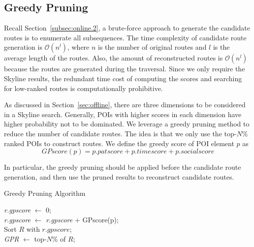 \vspace{-2mm}

\subsection{Greedy Pruning}
Recall Section~\ref{subsec:online.2}, a brute-force approach to generate the candidate routes is to enumerate all subsequences. The time complexity of candidate route generation is $\mathcal{O}(n^l)$, where $n$ is the number of original routes and $l$ is the average length of the routes. Also, the amount of reconstructed routes is $\mathcal{O}(n^l)$ because the routes are generated during the traversal. Since we only require the Skyline results, the redundant time cost of computing the scores and searching for low-ranked routes is computationally prohibitive. %

As discussed in Section~\ref{sec:offline}, there are three dimensions to be considered in a Skyline search. Generally, POIs with higher scores in each dimension have higher probability not to be dominated. We leverage a greedy pruning method to reduce the number of candidate routes. The idea is that we only use the top-$N$\% ranked POIs to construct routes. We define the greedy score of POI element $p$ as 
\begin{equation}
GPscore(p) = p.patscore+p.timescore+p.socialscore
\end{equation}

In particular, the greedy pruning should be applied before the candidate route generation, and then use the pruned results to reconstruct candidate routes. %

\begin{algorithm}[h] 
  \caption{Greedy Pruning Algorithm}
  \label{algo:GP}
  \small
  \Indm
  \Indp
   {
    \textit{r.gpscore} $\leftarrow$ 0;\\
     {   
      \textit{r.gpscore} $\leftarrow$ \textit{r.gpscore} + GPscore(p);\\
    }
  }
  Sort $R$ with $r.gpscore$;\\
  \textit{GPR} $\leftarrow$ top-$N$\% of $R$;\\
\end{algorithm}


